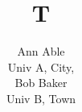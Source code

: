 \documentclass{article}

\title{T}
\author{Ann Able%
\begin{footnote}
{Univ A, City},
\end{footnote}
Bob Baker%
\begin{footnote} {Univ B, Town}
\end{footnote}}
\maketitle
x

